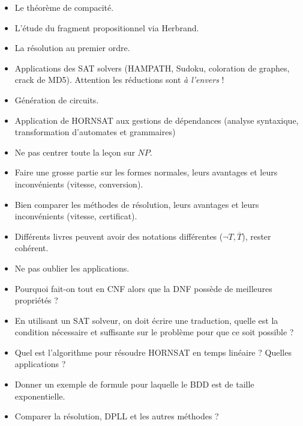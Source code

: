 \documentclass{agregfiche}
\begin{document}
\begin{itemize}
    \item Le théorème de compacité.
    \item L'étude du fragment propositionnel
        via Herbrand.
    \item La résolution au premier ordre.
    \item Applications des SAT solvers 
        (HAMPATH, Sudoku, coloration de graphes, crack de MD5). 
        Attention les réductions sont \emph{à l'envers} !
    \item Génération de circuits.
    \item Application de HORNSAT aux gestions de dépendances (analyse
        syntaxique, transformation d'automates et grammaires)
\end{itemize}

\secpieges

\begin{itemize}
    \item Ne pas centrer toute la leçon sur $NP$.
    \item Faire une grosse partie sur les formes normales, leurs avantages
        et leurs inconvénients (vitesse, conversion).
    \item Bien comparer les méthodes de résolution, leurs avantages et leurs
        inconvénients (vitesse, certificat).
        \item Différents livres peuvent avoir des notations 
        différentes ($\neg T, \overline{T}$), rester cohérent.
        \item Ne pas oublier les applications.
\end{itemize}


\secquestionsclassiques

\begin{itemize}
    \item Pourquoi fait-on tout en CNF alors que la DNF possède de meilleures 
        propriétés ?
    \item En utilisant un SAT solveur, on doit écrire une traduction, quelle
        est la condition nécessaire et suffisante sur le problème pour que ce soit
        possible ?
    \item Quel est l'algorithme pour résoudre HORNSAT en temps linéaire ?
        Quelles applications ?
    \item Donner un exemple de formule pour laquelle le BDD est de 
    taille
        exponentielle.
    \item Comparer la résolution, DPLL et les autres méthodes ?
\end{itemize}
\end{document}
